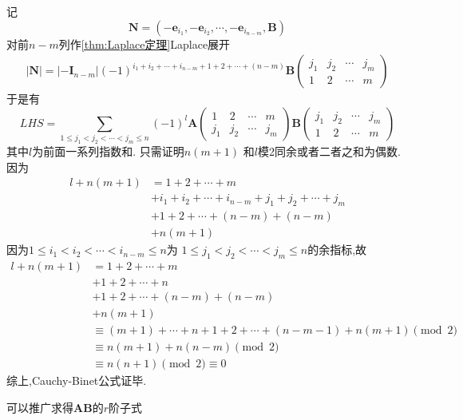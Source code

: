 \begin{formal}
\begin{Proof}
记\[
\bm{N}=\left(-\bm{e}_{i_1},-\bm{e}_{i_2},\cdots,-\bm{e}_{i_{n-m}},\bm{B}\right)
\]
对前$n-m$列作\cref{thm:Laplace定理}Laplace展开
\begin{align*}
    \left|\bm{N}\right|=\left|-\bm{I}_{n-m}\right|
    \left(-1\right)^{i_1+i_2+\cdots+i_{n-m}+1+2+\cdots+\left(n-m\right)}\bm{B}\begin{pmatrix}
        j_1&j_2&\cdots&j_m\\
        1&2&\cdots&m
    \end{pmatrix}
\end{align*}
于是有
\[
LHS = \sum_{1\leqslant j_1<j_2<\cdots<j_m\leqslant n}
\left(-1\right)^l\bm{A}\begin{pmatrix}
    1&2&\cdots&m\\
    j_1&j_2&\cdots&j_m
\end{pmatrix}\bm{B}\begin{pmatrix}
    j_1&j_2&\cdots&j_m\\
    1&2&\cdots&m
\end{pmatrix}
\]
其中$l$为前面一系列指数和.
只需证明$n\left(m+1\right)$
和$l$模2同余或者二者之和为偶数.
因为
\begin{align*}
    l+n\left(m+1\right)&=
    1+2+\cdots+m\\
    &+i_1+i_2+\cdots+i_{n-m}+j_1+j_2+\cdots+j_m\\
    &+1+2+\cdots+\left(n-m\right)+\left(n-m\right)
    \\
    &+n\left(m+1\right)
\end{align*}
因为$1\leqslant i_1
<i_2<\cdots<i_{n-m}
\leqslant n$为
$1\leqslant j_1
<j_2<\cdots<j_m
\leqslant n$的余指标,故
\begin{align*}
    l+n\left(m+1\right)&=
    1+2+\cdots+m\\
    &+1+2+\cdots+n\\
    &+1+2+\cdots+\left(n-m\right)+\left(n-m\right)
    \\
    &+n\left(m+1\right)\\
    &\equiv \left(m+1\right)+\cdots+n+1+2+\cdots+\left(n-m-1\right)+n\left(m+1\right)\pmod{2}\\
    &\equiv n\left(m+1\right)+
    n\left(n-m\right)
    \pmod{2}\\
    &\equiv n\left(n+1\right)\pmod{2}\equiv 0
\end{align*}
综上,Cauchy-Binet公式证毕.
\end{Proof}
\end{formal}
可以推广求得$\bm{AB}$的$r$阶子式
\setcounter{equation}{0}%
